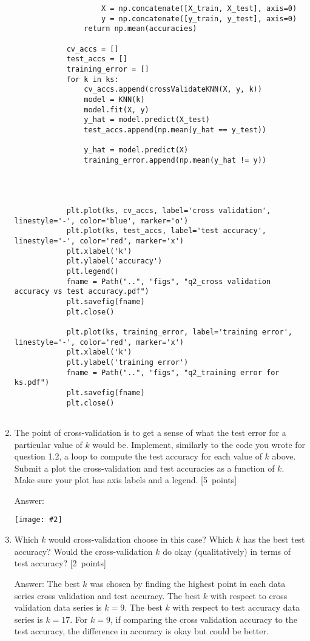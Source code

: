 \documentclass{article}
\newcommand{\blu}[1]{{\textcolor{blu}{#1}}}
\newcommand{\gre}[1]{\textcolor{gre}{#1}}
\newcommand\ans[1]{\par\gre{Answer: #1}}
\let\ask\blu
\newcommand\pts[1]{\textcolor{pointscolour}{[#1~points]}}
\newcommand{\centerfig}[2]{\begin{center}\texttt{[image: \#2]}\end{center}}
\begin{document}
\begin{enumerate}
\begin{verbatim}
                    X = np.concatenate([X_train, X_test], axis=0)
                    y = np.concatenate([y_train, y_test], axis=0)
                return np.mean(accuracies)
            
            cv_accs = []
            test_accs = []
            training_error = []
            for k in ks:
                cv_accs.append(crossValidateKNN(X, y, k))
                model = KNN(k)
                model.fit(X, y)
                y_hat = model.predict(X_test)
                test_accs.append(np.mean(y_hat == y_test))
        
                y_hat = model.predict(X)
                training_error.append(np.mean(y_hat != y))



                
            plt.plot(ks, cv_accs, label='cross validation', linestyle='-', color='blue', marker='o')
            plt.plot(ks, test_accs, label='test accuracy', linestyle='-', color='red', marker='x')
            plt.xlabel('k')
            plt.ylabel('accuracy')
            plt.legend()
            fname = Path("..", "figs", "q2_cross validation accuracy vs test accuracy.pdf")
            plt.savefig(fname)
            plt.close()
            
            plt.plot(ks, training_error, label='training error', linestyle='-', color='red', marker='x')
            plt.xlabel('k')
            plt.ylabel('training error')
            fname = Path("..", "figs", "q2_training error for ks.pdf")
            plt.savefig(fname)
            plt.close()
            
         \end{verbatim}
         \newpage
        

        \item The point of cross-validation is to get a sense of what the test error for a particular value of $k$ would be. Implement, similarly to the code you wrote for question 1.2, a loop to compute the test accuracy for each value of $k$ above. \ask{Submit a plot the cross-validation and test accuracies as a function of $k$.} Make sure your plot has axis labels and a legend. \pts{5}
        \ans{
        \centerfig{.7}{figs/q2_cross validation accuracy vs test accuracy.pdf}
        }

        \item Which $k$ would cross-validation choose in this case? Which $k$ has the best test accuracy? Would the cross-validation $k$ do okay (qualitatively) in terms of test accuracy? \pts{2}
        \ans{ The best $k$ was chosen by finding the highest point in each data series cross validation and test accuracy. The best $k$ with respect to cross validation data series is $k = 9$. The best $k$ with respect to test accuracy data series is $k = 17$. For $k = 9$, if comparing the cross validation accuracy to the test accuracy, the difference in accuracy is okay but could be better. }
        \newpage


\end{enumerate}
\end{document}
